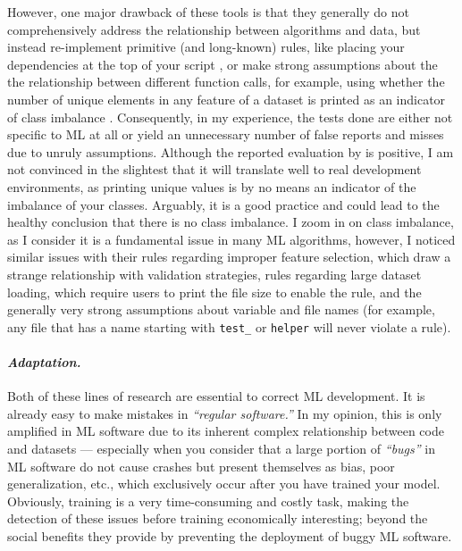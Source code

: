     However, one major drawback of these tools is that they generally do not comprehensively address the relationship between algorithms and data, but instead re-implement primitive (and long-known) rules, like placing your dependencies at the top of your script \citep{quaranta2024pynblint}, or make strong assumptions about the the relationship between different function calls, for example, using whether the number of unique elements in any feature of a dataset is printed as an indicator of class imbalance \citep{shivashankar2025mlscent}.
    Consequently, in my experience, the tests done are either not specific to ML at all or yield an unnecessary number of false reports and misses due to unruly assumptions.
    Although the reported evaluation by \citet{shivashankar2025mlscent} is positive, I am not convinced in the slightest that it will translate well to real development environments, as printing unique values is by no means an indicator of the imbalance of your classes.
    Arguably, it is a good practice and could lead to the healthy conclusion that there is no class imbalance.
    I zoom in on class imbalance, as I consider it is a fundamental issue in many ML algorithms, however, I noticed similar issues with their rules regarding improper feature selection, which draw a strange relationship with validation strategies, rules regarding large dataset loading, which require users to print the file size to enable the rule, and the generally very strong assumptions about variable and file names (for example, any file that has a name starting with \texttt{test\_} or \texttt{helper} will never violate a rule).
    
    \paragraph{\textit{Adaptation.}} Both of these lines of research \citep{recupito2024unmasking, shivashankar2025mlscent} are essential to correct ML development.
    It is already easy to make mistakes in \textit{``regular software.''}
    In my opinion, this is only amplified in ML software due to its inherent complex relationship between code and datasets --- especially when you consider that a large portion of \textit{``bugs''} in ML software do not cause crashes but present themselves as bias, poor generalization, etc., which exclusively occur after you have trained your model.
    Obviously, training is a very time-consuming and costly task, making the detection of these issues before training economically interesting; beyond the social benefits they provide by preventing the deployment of buggy ML software.

